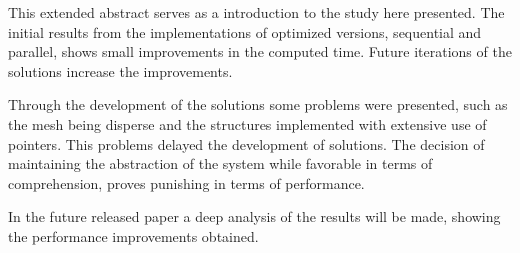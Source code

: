 \documentclass[a4paper,10pt,openright,openbib,twocolumn]{article}
\begin{document}
This extended abstract serves as a introduction to the study here presented. The initial results from the implementations of optimized versions, sequential and parallel, shows small improvements in the computed time. Future iterations of the solutions increase the improvements.

Through the development of the solutions some problems were presented, such as the mesh being disperse and the structures implemented with extensive use of pointers. This problems delayed the development of solutions. The decision of maintaining the abstraction of the system while favorable in terms of comprehension, proves punishing in terms of performance.

In the future released paper a deep analysis of the results will be made, showing the performance improvements obtained.
\end{document}
